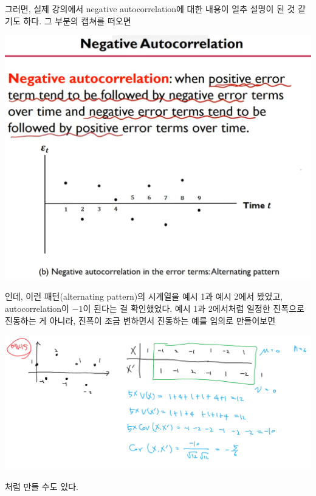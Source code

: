 \documentclass{article}
\begin{document}
그러면, 실제 강의에서 negative autocorrelation에 대한 내용이 얼추 설명이 된 것 같기도 하다.
그 부분의 캡쳐를 떠오면
\begin{center}
\includegraphics[width=.4\textwidth]{negative_autocorrelation}
\end{center}
인데, 이런 패턴(alternating pattern)의 시계열을 예시 1과 예시 2에서 봤었고, autocorrelation이 $-1$이 된다는 걸 확인했었다.
예시 1과 2에서처럼 일정한 진폭으로 진동하는 게 아니라, 진폭이 조금 변하면서 진동하는 예를 임의로 만들어보면
\begin{center}
\includegraphics[width=.6\textwidth]{autocorrelation-3}
\end{center}
처럼 만들 수도 있다.
\end{document}

